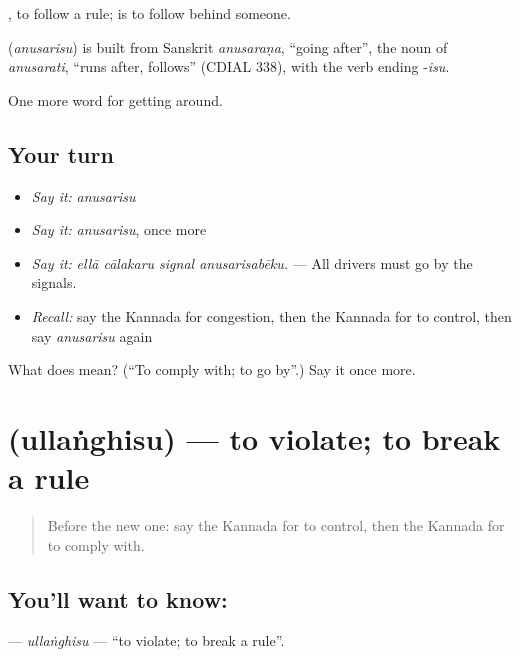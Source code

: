  , to follow a rule;  is to follow behind someone.

\begin{cousinweb}
\textbf{} (\emph{anusarisu}) is built from Sanskrit \emph{anusaraṇa}, \textquotedblleft{}going after\textquotedblright{}, the noun of \emph{anusarati}, \textquotedblleft{}runs after, follows\textquotedblright{} (CDIAL 338), with the verb ending -\emph{isu}.
\end{cousinweb}

\begin{grammarlens}[title={What you've built}]
One more word for getting around.
\end{grammarlens}

\subsection*{Your turn}
\begin{itemize}
\raggedright
  \item \emph{Say it:} \emph{anusarisu}
  \item \emph{Say it:} \emph{anusarisu}, once more
  \item \emph{Say it:} \emph{ellā cālakaru signal anusarisabēku.} — All drivers must go by the signals.
  \item \emph{Recall:} say the Kannada for congestion, then the Kannada for to control, then say \emph{anusarisu} again
\end{itemize}

\begin{tcolorbox}[breakable,colback=teal!4,colframe=teal!35!black,title={Before you move on}]
What does  mean? (\textquotedblleft{}To comply with; to go by\textquotedblright{}.) Say it once more.
\end{tcolorbox}
\section[\texorpdfstring{\kn{ಉಲ್ಲಂಘಿಸು} (ullaṅghisu)}{ಉಲ್ಲಂಘಿಸು (ullaṅghisu)}]{ (ullaṅghisu) — to violate; to break a rule}

\label{lesson:KA-C444-ullanghisu}



\begin{quote}
Before the new one: say the Kannada for to control, then the Kannada for to comply with.
\end{quote}

\subsection*{You'll want to know: }
\textbf{} — \emph{ullaṅghisu} — \textquotedblleft{}to violate; to break a rule\textquotedblright{}.

